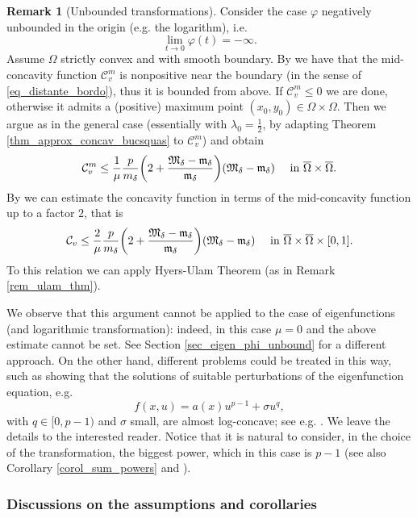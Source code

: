 \documentclass[11pt, reqno]{amsart}
\theoremstyle{definition}
\newtheorem{remark}[lemma]{Remark}
\numberwithin{equation}{section}
\newcommand{\mc}[1]{\mathcal{#1}}
\begin{document}
\begin{remark}[Unbounded transformations]
\label{rem_varphi_unbounded}
Consider the case $\varphi$ negatively unbounded in the origin (e.g. the logarithm), i.e.
$$\lim_{t \to 0} \varphi(t)=-\infty.$$ 
Assume $\Omega$ strictly convex and with smooth boundary.
By \cite[Lemma 3.2]{GrPo93} we have that the mid-concavity function $\mc{C}^m_v$ is nonpositive near the boundary (in the sense of \eqref{eq_distante_bordo}), thus it is bounded from above. 
If $\mc{C}^m_v \leq 0$ we are done, otherwise it admits a (positive) maximum point $(x_0,y_0) \in \Omega \times \Omega$. Then we argue as in the general case (essentially with $\lambda_0=\frac{1}{2}$, by adapting Theorem \ref{thm_approx_concav_bucsquas} to $\mc{C}^m_v$) and obtain
$$\mc{C}^m_{v} \leq \frac{1}{\mu} \frac{p}{m_{\delta}} \bigg( 2 + \frac{\mathfrak{M}_{\delta} - \mathfrak{m}_{\delta}}{\mathfrak{m}_{\delta}}\bigg) (\mathfrak{M}_{\delta}-\mathfrak{m}_{\delta}) \quad \hbox{ in $ \overline{\Omega} \times \overline{\Omega}$}.$$
By \cite[Corollary 1]{NgNi93} we can estimate the concavity function in terms of the mid-concavity function up to a factor $2$, that is
$$\mc{C}_{v} \leq \frac{2}{\mu} \frac{p}{m_{\delta}} \bigg( 2 + \frac{\mathfrak{M}_{\delta} - \mathfrak{m}_{\delta}}{\mathfrak{m}_{\delta}}\bigg) (\mathfrak{M}_{\delta}-\mathfrak{m}_{\delta}) \quad \hbox{ in $ \overline{\Omega} \times \overline{\Omega} \times [0,1]$}.$$
To this relation we can apply Hyers-Ulam Theorem \cite{HyUl52} (as in Remark \ref{rem_ulam_thm}).

We observe that this argument cannot be applied to the case of eigenfunctions (and logarithmic transformation): indeed, in this case $\mu=0$ and the above estimate cannot be set. See Section \ref{sec_eigen_phi_unbound} for a different approach. 
On the other hand, different problems could be treated in this way, such as showing that the solutions of suitable perturbations of the eigenfunction equation, e.g.
$$f(x,u) = a(x) u^{p-1} + \sigma u^q,$$
with $q \in [0, p-1)$ and $\sigma$ small, are almost log-concave; see e.g. \cite[Proposition 3.4]{ABCS23}. We leave the details to the interested reader.
Notice that it is natural to consider, in the choice of the transformation, the biggest power, which in this case is $p-1$ (see also Corollary \ref{corol_sum_powers} and \cite{Lio81}).
\end{remark}


\subsubsection{Discussions on the assumptions and corollaries}
\label{sec_disc_assumpt}
\end{document}
